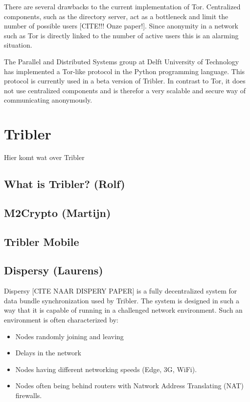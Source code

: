 \documentclass[11pt]{article}
\begin{document}
	There are several drawbacks to the current implementation of Tor. Centralized components, such as the directory server, act as a bottleneck and limit the number of possible users [CITE!!! Onze paper!]. Since anonymity in a network such as Tor is directly linked to the number of active users this is an alarming situation.
	
	The Parallel and Distributed Systems group at Delft University of Technology has implemented a Tor-like protocol in the Python programming language. This protocol is currently used in a beta version of Tribler. In contrast to Tor, it does not  use centralized components and is therefor a very scalable and secure way of communicating anonymously.

\section{Tribler}
Hier komt wat over Tribler

\subsection{What is Tribler? (Rolf)}

\subsection{M2Crypto (Martijn)}

\subsection{Tribler Mobile}

\subsection{Dispersy (Laurens)}
Dispersy [CITE NAAR DISPERY PAPER] is a fully decentralized system for data bundle synchronization used by Tribler. The system is designed in such a way that it is capable of running in a challenged network environment. Such an environment is often characterized by:
\begin{itemize}
\item Nodes randomly joining and leaving
\item Delays in the network
\item Nodes having different networking speeds (Edge, 3G, WiFi).
\item Nodes often being behind routers with Natwork Address Translating (NAT) firewalls.
\end{itemize}
\end{document}
